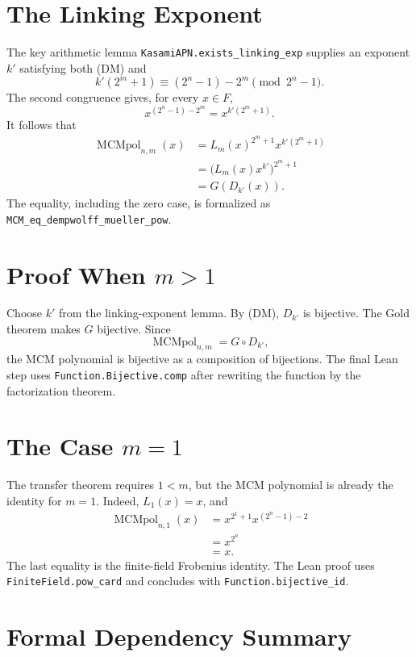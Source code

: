 \documentclass[11pt]{article}
\newcommand{\MCM}{\operatorname{MCMpol}}
\newcommand{\Trunc}{L}
\begin{document}
\section{The Linking Exponent}

The key arithmetic lemma \texttt{KasamiAPN.exists\_linking\_exp} supplies an
exponent $k'$ satisfying both \textup{(DM)} and
\[
  k'(2^m+1)\equiv(2^n-1)-2^m\pmod{2^n-1}.
  \tag{MCM}
\]
The second congruence gives, for every $x\in F$,
\[
  x^{(2^n-1)-2^m}=x^{k'(2^m+1)}.
\]
It follows that
\begin{align*}
  \MCM_{n,m}(x)
    &=\Trunc_m(x)^{2^m+1}x^{k'(2^m+1)}\\
    &=\bigl(\Trunc_m(x)x^{k'}\bigr)^{2^m+1}\\
    &=G(D_{k'}(x)).
\end{align*}
The equality, including the zero case, is formalized as
\texttt{MCM\_eq\_dempwolff\_mueller\_pow}.

\section{Proof When $m>1$}

Choose $k'$ from the linking-exponent lemma.  By \textup{(DM)}, $D_{k'}$ is
bijective.  The Gold theorem makes $G$ bijective.  Since
\[
  \MCM_{n,m}=G\circ D_{k'},
\]
the MCM polynomial is bijective as a composition of bijections.  The final Lean
step uses \texttt{Function.Bijective.comp} after rewriting the function by the
factorization theorem.

\section{The Case $m=1$}

The transfer theorem requires $1<m$, but the MCM polynomial is already the
identity for $m=1$.  Indeed, $\Trunc_1(x)=x$, and
\begin{align*}
  \MCM_{n,1}(x)
    &=x^{2^1+1}x^{(2^n-1)-2}\\
    &=x^{2^n}\\
    &=x.
\end{align*}
The last equality is the finite-field Frobenius identity.  The Lean proof uses
\texttt{FiniteField.pow\_card} and concludes with
\texttt{Function.bijective\_id}.

\section{Formal Dependency Summary}
\end{document}
